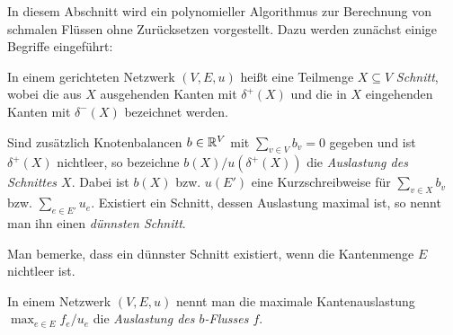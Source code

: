 In diesem Abschnitt wird ein polynomieller Algorithmus zur Berechnung von schmalen Flüssen ohne Zurücksetzen vorgestellt.
Dazu werden zunächst einige Begriffe eingeführt:

\begin{definition}[Schnitt]
	In einem gerichteten Netzwerk $(V, E, u)$ heißt eine Teilmenge $X\subseteq V$ \emph{Schnitt}, wobei die aus $X$ ausgehenden Kanten mit $\delta^+(X)$ und die in $X$ eingehenden Kanten mit $\delta^-(X)$ bezeichnet werden.
	
	Sind zusätzlich Knotenbalancen $b\in\mathbb{R}^V$ mit $\sum_{v\in V} b_v = 0$ gegeben und ist $\delta^+(X)$ nichtleer, so bezeichne $b(X) / u(\delta^+(X))$ die \emph{Auslastung des Schnittes $X$}.
	Dabei ist $b(X)$ bzw. $u(E')$ eine Kurzschreibweise für $\sum_{v\in X} b_v$ bzw. $\sum_{e\in E'} u_e$.
	Existiert ein Schnitt, dessen Auslastung maximal ist, so nennt man ihn einen \emph{dünnsten Schnitt}.
\end{definition}
Man bemerke, dass ein dünnster Schnitt existiert, wenn die Kantenmenge $E$ nichtleer ist.
\begin{definition}
	In einem Netzwerk $(V, E, u)$ nennt man die maximale Kantenauslastung $\max_{e\in E} f_e / u_e$ die \emph{Auslastung des $b$-Flusses $f$}.
\end{definition}

\begin{lemma}
\end{lemma}

